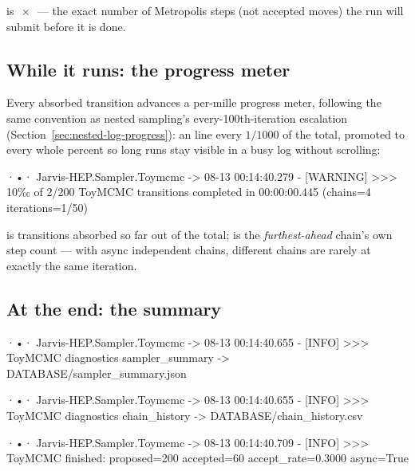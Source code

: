  is $\,\times\,$ ---
the exact number of Metropolis steps (not accepted moves) the run will submit before
it is done.

\subsection{While it runs: the progress meter}
\label{sec:toymcmc-log-progress}

Every absorbed transition advances a per-mille progress meter, following the same
convention as nested sampling's every-100th-iteration escalation
(Section~\ref{sec:nested-log-progress}): an \code{[INFO]} line every $1/1000$ of the
total, promoted to \code{[WARNING]} every whole percent so long runs stay visible in a
busy log without scrolling:

\begin{terminal}
\begin{jout}
·•· Jarvis-HEP.Sampler.Toymcmc
	-> 08-13 00:14:40.279 - [WARNING] >>>
10‰ of 2/200 ToyMCMC transitions completed in 00:00:00.445
(chains=4 iterations=1/50)
\end{jout}
\end{terminal}

 is transitions absorbed so far out of the total; 
is the \emph{furthest-ahead} chain's own step count --- with async independent chains,
different chains are rarely at exactly the same iteration.

\subsection{At the end: the summary}
\label{sec:toymcmc-log-summary}

\begin{terminal}
\begin{jout}
·•· Jarvis-HEP.Sampler.Toymcmc
	-> 08-13 00:14:40.655 - [INFO] >>>
ToyMCMC diagnostics sampler_summary -> DATABASE/sampler_summary.json

·•· Jarvis-HEP.Sampler.Toymcmc
	-> 08-13 00:14:40.655 - [INFO] >>>
ToyMCMC diagnostics chain_history -> DATABASE/chain_history.csv

·•· Jarvis-HEP.Sampler.Toymcmc
	-> 08-13 00:14:40.709 - [INFO] >>>
ToyMCMC finished: proposed=200 accepted=60 accept_rate=0.3000 async=True
\end{jout}
\end{terminal}

